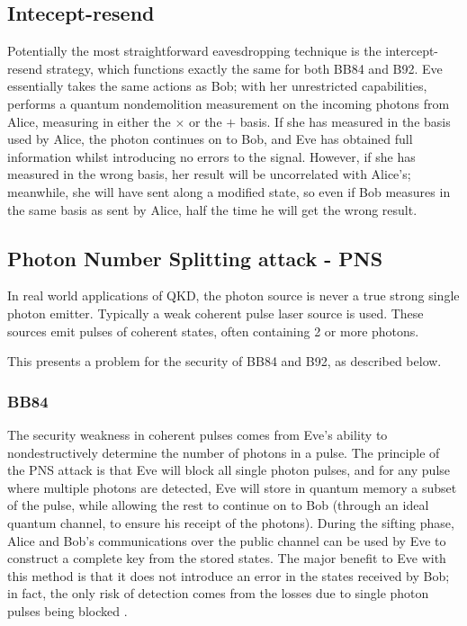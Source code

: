 \documentclass[paper=a4, fontsize=11pt]{scrartcl} %
\numberwithin{equation}{section} %
\numberwithin{figure}{section} %
\numberwithin{table}{section} %
\begin{document}
\subsection{Intecept-resend}
Potentially the most straightforward eavesdropping technique is the intercept-resend
strategy, which functions exactly the same for both BB84 and  B92.
Eve essentially takes the same actions as Bob; with her unrestricted capabilities, performs
a quantum nondemolition measurement on the incoming photons from Alice, measuring in either the $\times$
or the $+$ basis. If she has measured in the basis used by Alice, the photon continues on to Bob,
and Eve has obtained full information whilst introducing no errors to the signal. However, if she has measured
in the wrong basis, her result will be uncorrelated with Alice's; meanwhile, she will have sent along
a modified state, so even if Bob measures in the same basis as sent by Alice, half the time he will get the
wrong result. \citep{reviewScariani}


\subsection{Photon Number Splitting attack - PNS}
In real world applications of QKD, the photon source is never a true strong single photon emitter. Typically
a weak coherent pulse laser source is used. \citep{satellites}
These sources emit pulses of coherent states, often containing 2 or more photons.

This presents a problem for the security of BB84 and B92, as described below.

\subsubsection{BB84}
The security weakness in coherent pulses comes from Eve's ability to nondestructively determine the number of photons
in a pulse. The principle of the PNS attack is that Eve will block all single photon pulses, and for any pulse where
multiple photons are detected, Eve will store in quantum memory a subset of the pulse, while allowing the rest to continue
on to Bob (through an ideal quantum channel, to ensure his receipt of the photons). During the sifting
phase, Alice and Bob's communications over the public channel can be used by Eve to construct
a complete key from the stored states. The major benefit to Eve with this method is that it does not introduce an error in the
states received by Bob; in fact, the only risk of detection comes from the losses due to single photon pulses being blocked \citep{kronberg2009}.
\end{document}
